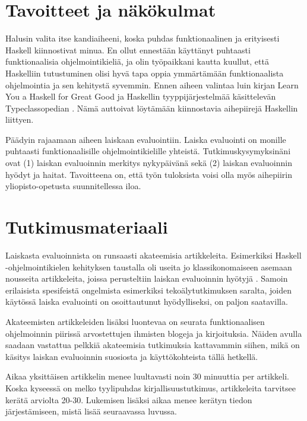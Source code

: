 \documentclass[12pt,a4paper,finnish,oneside]{article}
\begin{document}
\section{Tavoitteet ja näkökulmat}

Halusin valita itse kandiaiheeni, koska puhdas funktionaalinen ja erityisesti Haskell kiinnostivat minua. En ollut ennestään käyttänyt puhtaasti funktionaalisia ohjelmointikieliä, ja olin työpaikkani kautta kuullut, että Haskelliin tutustuminen olisi hyvä tapa oppia ymmärtämään funktionaalista ohjelmointia ja sen kehitystä syvemmin. Ennen aiheen valintaa luin kirjan Learn You a Haskell for Great Good \cite{lipovaca2011learn} ja Haskellin tyyppijärjestelmää käsittelevän Typeclassopedian \cite{yorgey2009typeclassopedia}. Nämä auttoivat löytämään kiinnostavia aihepiirejä Haskellin liittyen.

Päädyin rajaamaan aiheen laiskaan evaluointiin. Laiska evaluointi on monille puhtaasti funktionaalisille ohjelmointikielille yhteistä. Tutkimuskysymyksinäni ovat (1) laiskan evaluoinnin merkitys nykypäivänä sekä (2) laiskan evaluoinnin hyödyt ja haitat. Tavoitteena on, että työn tuloksista voisi olla myös aihepiirin yliopisto-opetusta suunnitellessa iloa.

\section{Tutkimusmateriaali}

\begin{sloppypar}
Laiskasta evaluoinnista on runsaasti akateemisia artikkeleita. Esimerkiksi Haskell -ohjelmointikielen kehityksen taustalla oli useita jo klassikonomaiseen asemaan nousseita artikkeleita, joissa perusteltiin laiskan evaluoinnin hyötyjä \cite{hudak2007history}. Samoin erilaisista spesifeistä ongelmista esimerkiksi tekoälytutkimuksen saralta, joiden käytössä laiska evaluointi on osoittautunut hyödylliseksi, on paljon saatavilla.
\end{sloppypar}

Akateemisten artikkeleiden lisäksi luontevaa on seurata funktionaalisen ohjelmoinnin piirissä arvostettujen ihmisten blogeja ja kirjoituksia. Näiden avulla saadaan vastattua pelkkiä akateemisia tutkimuksia kattavammin siihen, mikä on käsitys laiskan evaluoinnin suosiosta ja käyttökohteista tällä hetkellä.

Aikaa yksittäisen artikkelin menee luultavasti noin 30 minuuttia per artikkeli. Koska kyseessä on melko tyylipuhdas kirjallisuustutkimus, artikkeleita tarvitsee kerätä arviolta 20-30. Lukemisen lisäksi aikaa menee kerätyn tiedon järjestämiseen, mistä lisää seuraavassa luvussa.
\end{document}
